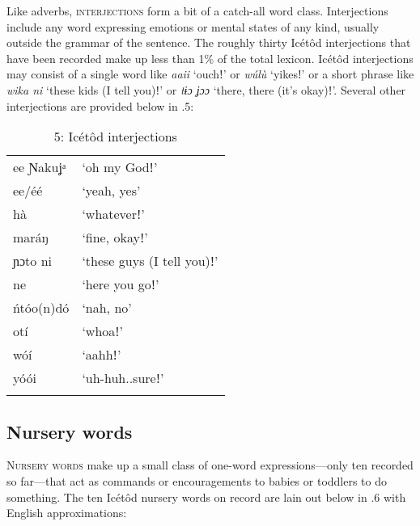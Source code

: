 Like adverbs, \textsc{interjections} form a bit of a catch-all word class. Interjections include any word expressing emotions or mental states of any kind, usually outside the grammar of the sentence. The roughly thirty Icétôd interjections that have been recorded make up less than 1\% of the total lexicon. Icétôd interjections may consist of a single word like \textit{aaii }‘ouchǃ’ or \textit{wúlù }‘yikesǃ’ or a short phrase like \textit{wika ni }‘these kids (I tell you)ǃ’ or \textit{tɨɔ ʝɔɔ }‘there, there (it’s okay)ǃ’. Several other interjections are provided below in .5:


\begin{table}
\caption{5: Icétôd interjections}
\label{tab:3}


\begin{tabularx}{\textwidth}{XX}
\lsptoprule

ee Ɲakuʝᵃ & ‘oh my Godǃ’\\
ee/éé & ‘yeah, yes’\\
hà & ‘whateverǃ’\\
maráŋ & ‘fine, okayǃ’\\
ɲɔto ni & ‘these guys (I tell you)ǃ’\\
ne & ‘here you goǃ’\\
ńtóo(n)dó & ‘nah, no’\\
otí & ‘whoaǃ’\\
wóí & ‘aahhǃ’\\
yóói & ‘uh-huh..sureǃ’\\
\lspbottomrule
\end{tabularx}
\end{table}



\subsection{Nursery words}


\textsc{Nursery} \textsc{words} make up a small class of one-word expressions—only ten recorded so far—that act as commands or encouragements to babies or toddlers to do something. The ten Icétôd nursery words on record are lain out below in .6 with English approximations:


